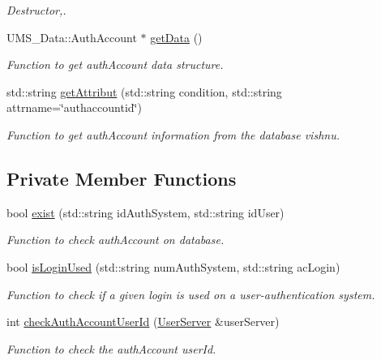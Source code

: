 \begin{DoxyCompactItemize}
\begin{DoxyCompactList}\small\item\em Destructor,. \item\end{DoxyCompactList}\item 
UMS\_\-Data::AuthAccount $\ast$ \hyperlink{classAuthAccountServer_a2c42535d2ea889389795be45f751a8ec}{getData} ()
\begin{DoxyCompactList}\small\item\em Function to get authAccount data structure. \item\end{DoxyCompactList}\item 
std::string \hyperlink{classAuthAccountServer_a8c83174b588552478c188e7a31baf3b8}{getAttribut} (std::string condition, std::string attrname=\char`\"{}authaccountid\char`\"{})
\begin{DoxyCompactList}\small\item\em Function to get authAccount information from the database vishnu. \item\end{DoxyCompactList}\end{DoxyCompactItemize}
\subsection*{Private Member Functions}
\begin{DoxyCompactItemize}
\item 
bool \hyperlink{classAuthAccountServer_ae2fdc812129a52c5988c3efe69dc643b}{exist} (std::string idAuthSystem, std::string idUser)
\begin{DoxyCompactList}\small\item\em Function to check authAccount on database. \item\end{DoxyCompactList}\item 
bool \hyperlink{classAuthAccountServer_a6fb1e6d4302d269aebdde700a085ff0c}{isLoginUsed} (std::string numAuthSystem, std::string acLogin)
\begin{DoxyCompactList}\small\item\em Function to check if a given login is used on a user-\/authentication system. \item\end{DoxyCompactList}\item 
int \hyperlink{classAuthAccountServer_a58740d1af7c203dca615c3ae1e0daad4}{checkAuthAccountUserId} (\hyperlink{classUserServer}{UserServer} \&userServer)
\begin{DoxyCompactList}\small\item\em Function to check the authAccount userId. \item\end{DoxyCompactList}\end{DoxyCompactItemize}

